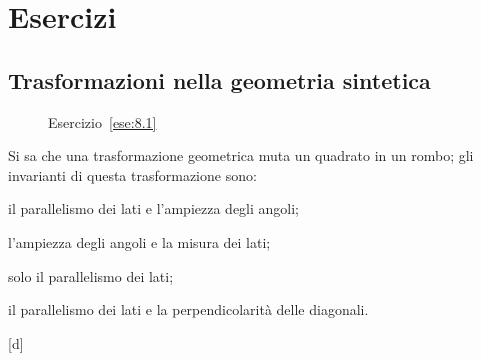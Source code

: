 
\begin{comment}

\begin{esercizio}
\label{ese:}
~

\noindent\begin{minipage}{.45\textwidth}

\end{minipage} 
\begin{minipage}{.55\textwidth}
\begin{inaccessibleblock}[Figura: TODO]
\begin{center}  \end{center}
\end{inaccessibleblock}
\end{minipage}
\end{esercizio}

\end{comment}

\section{Esercizi}


\subsection{Trasformazioni nella geometria sintetica}

\begin{inaccessibleblock}
 \begin{figure}[!htb]
  \centering
  \caption{Esercizio~\ref{ese:8.1}}\label{fig:ese8.1}
\end{figure}
\end{inaccessibleblock}

\begin{esercizio}
\label{ese:8.2}
Si sa che una trasformazione geometrica muta un quadrato in un rombo; 
gli invarianti di questa trasformazione sono:
\begin{enumeratea}
\item il parallelismo dei lati e l'ampiezza degli angoli;
\item l'ampiezza degli angoli e la misura dei lati;
\item solo il parallelismo   dei lati;
\item il parallelismo dei lati e la perpendicolarità delle diagonali.
\end{enumeratea}
\hfill [d]
\end{esercizio}

